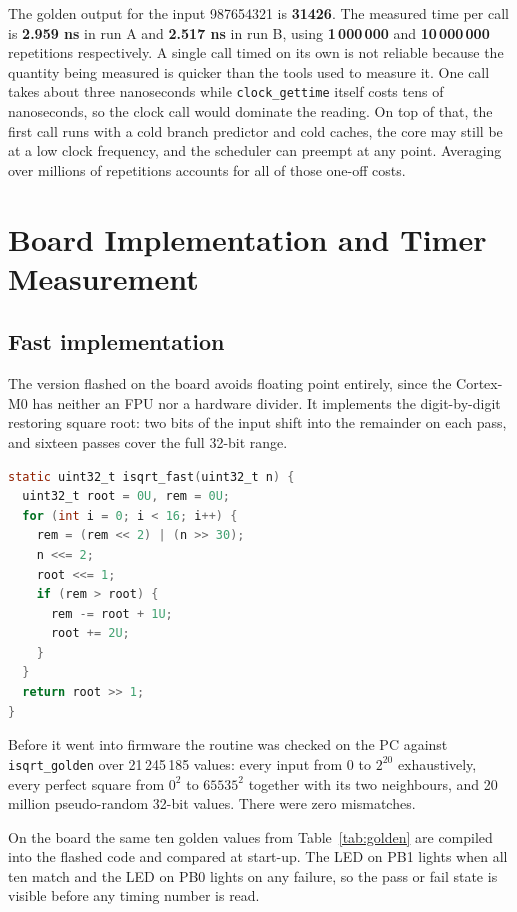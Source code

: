 \documentclass[11pt]{article}
\begin{document}
The golden output for the input 987654321 is \textbf{31426}. The measured time
per call is \textbf{2.959 ns} in run A and \textbf{2.517 ns} in run B, using
\textbf{1\,000\,000} and \textbf{10\,000\,000} repetitions respectively.
\noindent
A single call timed on its own is not reliable because the quantity being
measured is quicker than the tools used to measure it. One call takes about three
nanoseconds while \texttt{clock\_gettime} itself costs tens of nanoseconds, so
the clock call would dominate the reading. On top of that, the first call runs
with a cold branch predictor and cold caches, the core may still be at a low
clock frequency, and the scheduler can preempt at any point. Averaging over
millions of repetitions accounts for all of those one-off costs.

\clearpage
\section{Board Implementation and Timer Measurement}

\subsection{Fast implementation}

The version flashed on the board avoids floating point entirely, since the Cortex-M0 has
neither an FPU nor a hardware divider. It implements the digit-by-digit
restoring square root: two bits of the input shift into the remainder on each
pass, and sixteen passes cover the full 32-bit range.

\begin{lstlisting}[language=C]
static uint32_t isqrt_fast(uint32_t n) {
  uint32_t root = 0U, rem = 0U;
  for (int i = 0; i < 16; i++) {
    rem = (rem << 2) | (n >> 30);
    n <<= 2;
    root <<= 1;
    if (rem > root) {
      rem -= root + 1U;
      root += 2U;
    }
  }
  return root >> 1;
}
\end{lstlisting}

\noindent
Before it went into firmware the routine was checked on the PC against
\texttt{isqrt\_golden} over 21\,245\,185 values: every input from 0 to
$2^{20}$ exhaustively, every perfect square from $0^2$ to $65535^2$ together
with its two neighbours, and 20 million pseudo-random 32-bit values. There were
zero mismatches.

\noindent
On the board the same ten golden values from Table~\ref{tab:golden} are
compiled into the flashed code and compared at start-up. The LED on PB1 lights when all
ten match and the LED on PB0 lights on any failure, so the pass or fail state
is visible before any timing number is read.
\end{document}
